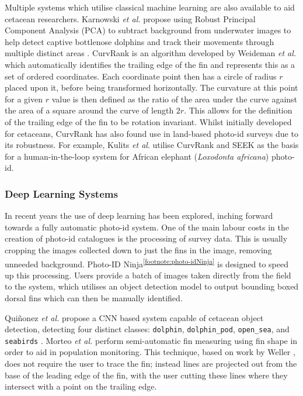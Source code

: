 Multiple systems which utilise classical machine learning are also available to aid cetacean researchers. Karnowski \textit{et al.} propose using Robust Principal Component Analysis (PCA) to subtract background from underwater images to help detect captive bottlenose dolphins and track their movements through multiple distinct areas \cite{karnowski_dolphin_2015}. CurvRank is an algorithm developed by Weideman \textit{et al.} \cite{weideman_integral_2017} which automatically identifies the trailing edge of the fin and represents this as a set of ordered coordinates. Each coordinate point then has a circle of radius $r$ placed upon it, before being transformed horizontally. The curvature at this point for a given $r$ value is then defined as the ratio of the area under the curve against the area of a square around the curve of length $2r$. This allows for the definition of the trailing edge of the fin to be rotation invariant. Whilst initially developed for cetaceans, CurvRank has also found use in land-based photo-id surveys due to its robustness. For example, Kulits \textit{et al}. \cite{kulits_elephantbook_2021} utilise CurvRank and SEEK \cite{bedetti_system_2020} as the basis for a human-in-the-loop system for African elephant (\textit{Loxodonta africana}) photo-id. 

\subsubsection{Deep Learning Systems}\label{ch:Background,sec:conTech,sub:photoIDAides,subsub:DL}

In recent years the use of deep learning has been explored, inching forward towards a fully automatic photo-id system. One of the main labour costs in the creation of photo-id catalogues is the processing of survey data. This is usually cropping the images collected down to just the fins in the image, removing unneeded background. Photo-ID Ninja\textsuperscript{\ref{footnote:photo-idNinja}} is designed to speed up this processing. Users provide a batch of images taken directly from the field to the system, which utilises an object detection model to output bounding boxed dorsal fins which can then be manually identified.

Qui\~{n}onez \textit{et al.} propose a CNN based system capable of cetacean object detection, detecting four distinct classes: \texttt{dolphin}, \texttt{dolphin\_pod}, \texttt{open\_sea}, and \texttt{seabirds} \cite{quinonez_using_2019}. Morteo \textit{et al.} \cite{morteo_phenotypic_2017} perform semi-automatic fin measuring using fin shape in order to aid in population monitoring. This technique, based on work by Weller \cite{weller_global_1998}, does not require the user to trace the fin; instead lines are projected out from the base of the leading edge of the fin, with the user cutting these lines where they intersect with a point on the trailing edge. 

